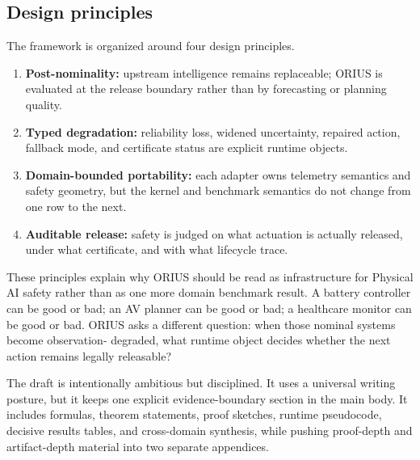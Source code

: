 \subsection{Design principles}
The framework is organized around four design principles.
\begin{enumerate}[leftmargin=1.25em,itemsep=0.2em]
  \item \textbf{Post-nominality:} upstream intelligence remains replaceable; ORIUS is
  evaluated at the release boundary rather than by forecasting or planning quality.
  \item \textbf{Typed degradation:} reliability loss, widened uncertainty, repaired
  action, fallback mode, and certificate status are explicit runtime objects.
  \item \textbf{Domain-bounded portability:} each adapter owns telemetry semantics and
  safety geometry, but the kernel and benchmark semantics do not change from one row to
  the next.
  \item \textbf{Auditable release:} safety is judged on what actuation is actually
  released, under what certificate, and with what lifecycle trace.
\end{enumerate}

These principles explain why ORIUS should be read as infrastructure for Physical AI
safety rather than as one more domain benchmark result. A battery controller can be
good or bad; an AV planner can be good or bad; a healthcare monitor can be good or
bad. ORIUS asks a different question: when those nominal systems become observation-
degraded, what runtime object decides whether the next action remains legally releasable?

The draft is intentionally ambitious but disciplined. It uses a universal writing
posture, but it keeps one explicit evidence-boundary section in the main body. It
includes formulas, theorem statements, proof sketches, runtime pseudocode, decisive
results tables, and cross-domain synthesis, while pushing proof-depth and artifact-depth
material into two separate appendices.
